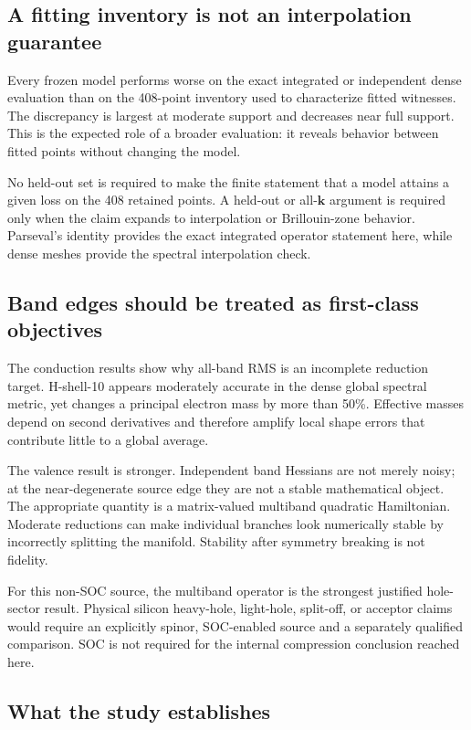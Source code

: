 \documentclass[11pt]{article}
\newcommand{\kvec}{\mathbf{k}}
\begin{document}
\subsection{A fitting inventory is not an interpolation guarantee}

Every frozen model performs worse on the exact integrated or independent dense
evaluation than on the 408-point inventory used to characterize fitted witnesses.  The
discrepancy is largest at moderate support and decreases near full support.  This is the
expected role of a broader evaluation: it reveals behavior between fitted points without
changing the model.

No held-out set is required to make the finite statement that a model attains a given
loss on the 408 retained points.  A held-out or all-\(\kvec\) argument is required only
when the claim expands to interpolation or Brillouin-zone behavior.  Parseval's identity
provides the exact integrated operator statement here, while dense meshes provide the
spectral interpolation check.

\subsection{Band edges should be treated as first-class objectives}

The conduction results show why all-band RMS is an incomplete reduction target.
H-shell-10 appears moderately accurate in the dense global spectral metric, yet changes
a principal electron mass by more than 50\%.  Effective masses depend on second
derivatives and therefore amplify local shape errors that contribute little to a global
average.

The valence result is stronger.  Independent band Hessians are not merely noisy; at the
near-degenerate source edge they are not a stable mathematical object.  The appropriate
quantity is a matrix-valued multiband quadratic Hamiltonian.  Moderate reductions can
make individual branches look numerically stable by incorrectly splitting the
manifold.  Stability after symmetry breaking is not fidelity.

For this non-SOC source, the multiband operator is the strongest justified hole-sector
result.  Physical silicon heavy-hole, light-hole, split-off, or acceptor claims would
require an explicitly spinor, SOC-enabled source and a separately qualified comparison.
SOC is not required for the internal compression conclusion reached here.

\subsection{What the study establishes}
\end{document}
